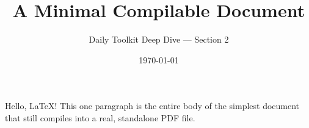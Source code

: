 \documentclass[11pt]{article}
\title{A Minimal Compilable Document}
\author{Daily Toolkit Deep Dive --- Section 2}
\date{\today}
\begin{document}
\maketitle

Hello, LaTeX! This one paragraph is the entire body of the simplest
document that still compiles into a real, standalone PDF file.
\end{document}
